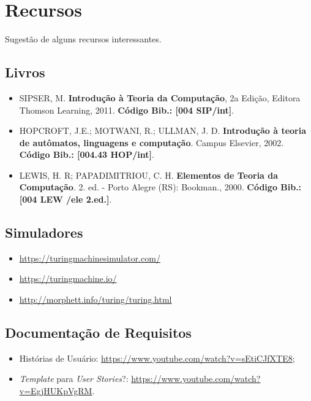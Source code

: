 \documentclass[a4paper, 11pt]{article}
\begin{document}
	\section{Recursos}
	
	Sugestão de alguns recursos interessantes.
	
	\subsection{Livros}
	
	    \begin{itemize}
	        \item SIPSER, M. {\bf Introdução à Teoria da Computação}, 2a Edição, Editora Thomson Learning, 2011. {\color{blue} \bf Código Bib.: [004 SIP/int]}.
	        \item HOPCROFT, J.E.; MOTWANI, R.; ULLMAN, J. D. {\bf Introdução à teoria de autô\-matos, linguagens e computação}. Campus Elsevier, 2002. {\color{blue} \bf Código Bib.: [004.43 HOP/int]}.
	        \item LEWIS, H. R; PAPADIMITRIOU, C. H. {\bf Elementos de Teoria da Computação}. 2. ed. - Porto Alegre (RS): Bookman., 2000. {\color{blue} \bf Código Bib.: [004 LEW /ele 2.ed.]}.
	    \end{itemize}
	
	\subsection{Simuladores}
	
	\begin{itemize}
	    \item \url{https://turingmachinesimulator.com/}
	    \item \url{https://turingmachine.io/}
	    \item \url{http://morphett.info/turing/turing.html}
	\end{itemize}
	
	\subsection{Documentação de Requisitos}
	
	\begin{itemize}
	    \item Histórias de Usuário: \url{https://www.youtube.com/watch?v=sEtiCJfXTE8};
	    \item {\it Template} para {\it User Stories}?: \url{https://www.youtube.com/watch?v=EgjHUKpVgRM}.
	\end{itemize}
	
	
\end{document}
